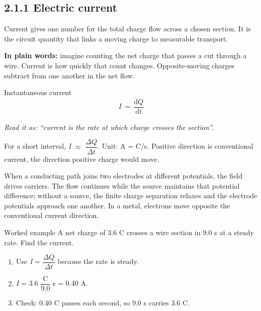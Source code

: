 \documentclass[11pt]{article}
\begin{document}
\begin{keepsection}
\section{2.1.1 Electric current}

Current gives one number for the total charge flow across a chosen section. It is the circuit quantity that links a moving charge to measurable transport.

\begin{plainbox}\textbf{In plain words:} imagine counting the net charge that passes a cut through a wire. Current is how quickly that count changes. Opposite-moving charges subtract from one another in the net flow.\end{plainbox}

\begin{equationcard}{Instantaneous current}
\[ \begin{gathered} {I}\, =\, \dfrac{\mathrm{d}{Q}}{\mathrm{d}{t}} \end{gathered} \]
{\small \emph{Read it as: “current is the rate at which charge crosses the section”.}\par For a short interval, \textit{I} \ensuremath{\approx} {\small\ensuremath{\dfrac{Δ{Q}}{Δ{t}}}}. Unit: A = C/s. Positive direction is conventional current, the direction positive charge would move.}
\end{equationcard}

When a conducting path joins two electrodes at different potentials, the field drives carriers. The flow continues while the source maintains that potential difference; without a source, the finite charge separation relaxes and the electrode potentials approach one another. In a metal, electrons move opposite the conventional current direction.

\begin{workedbox}{Worked example}
A net charge of 3.6 C crosses a wire section in 9.0 s at a steady rate. Find the current.

\begin{enumerate}
\item Use \textit{I} = {\small\ensuremath{\dfrac{Δ{Q}}{Δ{t}}}} because the rate is steady.
\item \textit{I} = 3.6 {\small\ensuremath{\dfrac{\mathrm{C}}{9.0}}} s = 0.40 A.
\item Check: 0.40 C passes each second, so 9.0 s carries 3.6 C.
\end{enumerate}
\end{workedbox}


\end{keepsection}
\end{document}
